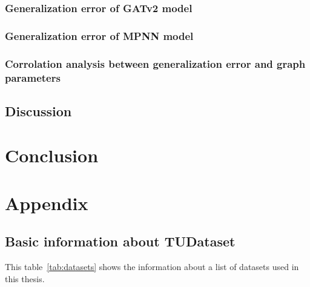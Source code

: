 \documentclass{article}
\begin{document}
\subsubsection{Generalization error of GATv2 model}

\subsubsection{Generalization error of MPNN model}

\subsubsection{Corrolation analysis between generalization error and graph parameters}



\subsection{Discussion}

\section{Conclusion}




\clearpage



\clearpage

\section{Appendix} 
 
\subsection{Basic information about TUDataset}\label{sec:datasets}
This table~\ref{tab:datasets} shows the information about a list of datasets used in this thesis.
\end{document}
